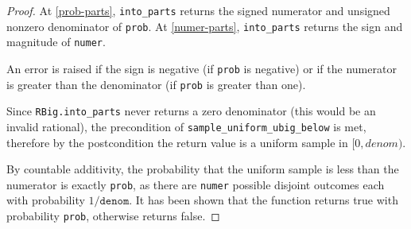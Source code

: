 \documentclass{article}
\begin{document}
\begin{proof}  
At \ref{prob-parts}, \texttt{into\_parts} returns the signed numerator and unsigned nonzero denominator of \texttt{prob}. 
At \ref{numer-parts}, \texttt{into\_parts} returns the sign and magnitude of \texttt{numer}. 
 
An error is raised if the sign is negative (if \texttt{prob} is negative)  
or if the numerator is greater than the denominator (if \texttt{prob} is greater than one). 
 
Since \texttt{RBig.into\_parts} never returns a zero denominator (this would be an invalid rational), 
the precondition of \texttt{sample\_uniform\_ubig\_below} is met, 
therefore by the postcondition the return value is a uniform sample in $[0, denom)$. 
 
By countable additivity, the probability that the uniform sample is less than the numerator is exactly \texttt{prob}, 
as there are \texttt{numer} possible disjoint outcomes each with probability $1 / \texttt{denom}$. 
It has been shown that the function returns true with probability \texttt{prob}, otherwise returns false. 
\end{proof} 
 
\end{document}
